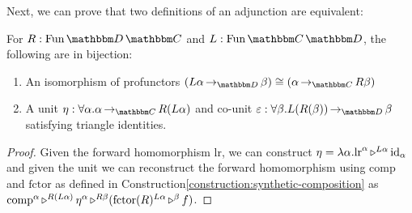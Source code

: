 \documentclass{llncs}
\begin{document}
Next, we can prove that two definitions of an adjunction are equivalent:
\begin{lemma} \label{lem:adjunction}
  For $R : \varr {\cat D}{\cat C}$ and $L : \varr {\cat
    C}{\cat D}$, the following are in bijection:
  \begin{enumerate}
  \item An isomorphism of profunctors $(\punitinXfromYtoZ {\cat D} {L \alpha}{\beta}) \cong (\punitinXfromYtoZ {\cat C} \alpha {R \beta})$
  \item A unit $\eta : \pendallXdotY \alpha {\punitinXfromYtoZ {\cat C} \alpha
    {R(L\alpha)}}$ and co-unit $\varepsilon: \pendallXdotY \beta
    {\punitinXfromYtoZ {\cat D} {L(R(\beta))}{\beta}}$ satisfying triangle
    identities.
  \end{enumerate}
\end{lemma}
\begin{proof}
  Given the forward homomorphism $\text{lr}$, we can construct $\eta =
  \pendlambdaXdotY \alpha \appunary {\text{lr}} \alpha {\punitrefl
    \alpha} {L \alpha}$ and given the unit we can reconstruct the
  forward homomorphism using
  $\text{comp}$ and $\text{fctor}$ as defined in
  Construction\ref{construction:synthetic-composition} as
  $\appbinary {\text{comp}} \alpha
  {\pendappXtoY \eta \alpha} {R(L\alpha)} {(\appunary
    {\text{fctor}(R)}{L \alpha} {f} {\beta})} {R \beta}$.
\end{proof}
\end{document}
